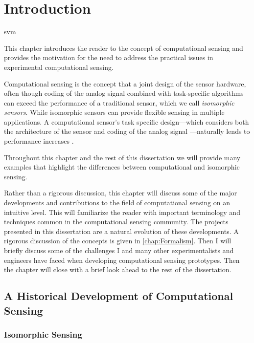 

\chapter{Introduction}


\gls{svm}

This chapter introduces the reader to the concept of computational sensing and provides the motivation for the need to address the practical issues in experimental computational sensing. 

Computational sensing is the concept that a joint design of the sensor hardware, often though coding of the analog signal combined with task-specific algorithms can exceed the performance of a traditional sensor, which we call \emph{isomorphic sensors}. While isomorphic sensors can provide flexible sensing in multiple applications. A computational sensor's task specific design---which considers both the architecture of the sensor and coding of the analog signal ---naturally lends to performance increases \cite{neifeld2006taskSpecificSensing}. 

Throughout this chapter and the rest of this dissertation we will provide many examples that highlight the differences between computational and isomorphic sensing. 

Rather than a rigorous discussion, this chapter will discuss some of the major developments and contributions to the field of computational sensing on an intuitive level. This will familiarize the reader with important terminology and techniques common in the computational sensing community. The projects presented in this dissertation are a natural evolution of these developments. A rigorous discussion of the concepts is given in \autoref{chap:Formalism}. Then I will briefly discuss some of the challenges I and many other experimentalists and engineers have faced when developing computational sensing prototypes. Then the chapter will close with a brief look ahead to the rest of the dissertation. 


\section{A Historical Development of Computational Sensing}

\subsection{Isomorphic Sensing}

